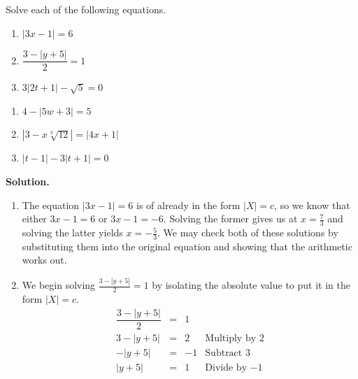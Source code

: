 \documentclass{ximera}
\begin{document}
\begin{example} \label{absvalueeqnex}  Solve each of the following equations.


\begin{enumerate}

\item  $|3x-1| = 6$
\item  $\dfrac{3 - |y+5|}{2} = 1$
\item  $3|2t+1| - \sqrt{5} = 0$

\setcounter{HW}{\value{enumi}}
\end{enumerate}



\begin{enumerate}
\setcounter{enumi}{\value{HW}}

\item  $4 - |5w+3| = 5$

\item  $\left|3 - x \sqrt[3]{12}\right| = |4x+1|$

\item  $|t-1| - 3|t+1| = 0$

\end{enumerate}



{\bf Solution.} 

\begin{enumerate}

\item  The equation  $|3x-1| = 6$ is of already in the form $|X| = c$, so we know that either $3x-1=6$ or $3x-1 = -6$.  Solving the former gives us at $x = \frac{7}{3}$ and solving the latter yields $x = -\frac{5}{3}$.  We may check both of these solutions by substituting them into the original equation and showing that the arithmetic works out.

\item  We begin solving  $\frac{3 - |y+5|}{2} = 1$ by isolating the absolute value to put it in the form $|X| = c$.\[ \begin{array}{rclr}
\dfrac{3 - |y+5|}{2} & = & 1 &  \\
3 - |y+5| & = & 2 & \text{Multiply by $2$}\\
-|y+5| & = & -1 & \text{Subtract $3$} \\
|y+5| & = & 1 & \text{Divide by $-1$}  \\ 


\end{array}\]
\end{enumerate}
\end{example}
\end{document}
